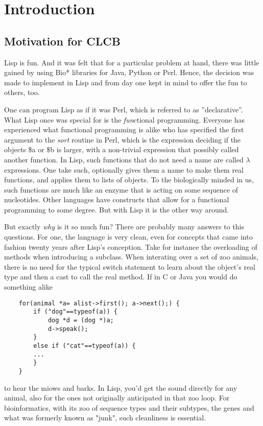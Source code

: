 \documentclass{book}
\begin{document}
\chapter{Introduction}



\section{Motivation for CLCB}

Lisp is fun. And it was felt that for a particular problem at hand, 
there was little gained by using Bio* libraries for Java, Python or Perl.
Hence, the decision was made to implement in Lisp and from day one kept in
mind to offer the fun to others, too.

One can program Lisp as if it was Perl, which is referred to as
''declarative''. What Lisp once was special for is the {\em fun}ctional
programming. Everyone has experienced what functional programming is alike
who has specified the first argument to the {\em sort} routine in Perl,
which is the expression deciding if the objects \$a or \$b is larger, with
a non-trivial expression that possibly called another function.  In Lisp,
such functions that do not need a name are called $\lambda$ expressions.
One take such, optionally gives them a name to make them real functions,
and applies them to lists of objects. To the biologically minded in us,
such functions are much like an enzyme that is acting on some sequence of
nucleotides. Other languages have constructs that allow for a functional
programming to some degree. But with Lisp it is the other way around.

But exactly {\em why} is it so much fun? There are probably many answers
to this questions.  For one, the language is very clean, even for concepts
that came into fashion twenty years after Lisp's conception. Take
for instance the overloading of methods when introducing a subclass.
When interating over a set of zoo animals, there is no need for the
typical switch statement to learn about the object's real type and then a
cast to call the real method. If in C or Java you would do something alike

\lstset{language=C}
\begin{lstlisting}
	for(animal *a= alist->first(); a->next();) {
		if ("dog"==typeof(a)) {
			dog *d = (dog *)a;
			d->speak();
		}
		else if ("cat"==typeof(a)) {
		...
		}
	}
\end{lstlisting}

to hear the miows and barks.  In Lisp, you'd get the sound directly for
any animal, also for the ones not originally anticipated in that zoo loop.
For bioinformatics, with its zoo of sequence types and their subtypes,
the genes and what was formerly known as "junk", such cleanliness is essential.
\end{document}
